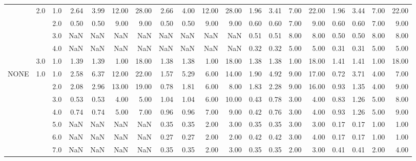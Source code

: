 \begin{tabular}{lllrrrrrrrrrrrrrrrr}
     & 2.0 & 1.0  &       2.64 &      3.99 & 12.00 &  28.00 &       2.66 &      4.00 & 12.00 &  28.00 &       1.96 &      3.41 &  7.00 &  22.00 &       1.96 &      3.44 & 7.00 &  22.00 \\
     &     & 2.0  &       0.50 &      0.50 &  9.00 &   9.00 &       0.50 &      0.50 &  9.00 &   9.00 &       0.60 &      0.60 &  7.00 &   9.00 &       0.60 &      0.60 & 7.00 &   9.00 \\
     &     & 3.0  &        NaN &       NaN &   NaN &    NaN &        NaN &       NaN &   NaN &    NaN &       0.51 &      0.51 &  8.00 &   8.00 &       0.50 &      0.50 & 8.00 &   8.00 \\
     &     & 4.0  &        NaN &       NaN &   NaN &    NaN &        NaN &       NaN &   NaN &    NaN &       0.32 &      0.32 &  5.00 &   5.00 &       0.31 &      0.31 & 5.00 &   5.00 \\
     & 3.0 & 1.0  &       1.39 &      1.39 &  1.00 &  18.00 &       1.38 &      1.38 &  1.00 &  18.00 &       1.38 &      1.38 &  1.00 &  18.00 &       1.41 &      1.41 & 1.00 &  18.00 \\
NONE & 1.0 & 1.0  &       2.58 &      6.37 & 12.00 &  22.00 &       1.57 &      5.29 &  6.00 &  14.00 &       1.90 &      4.92 &  9.00 &  17.00 &       0.72 &      3.71 & 4.00 &   7.00 \\
     &     & 2.0  &       2.08 &      2.96 & 13.00 &  19.00 &       0.78 &      1.81 &  6.00 &   8.00 &       1.83 &      2.28 &  9.00 &  16.00 &       0.93 &      1.35 & 4.00 &   9.00 \\
     &     & 3.0  &       0.53 &      0.53 &  4.00 &   5.00 &       1.04 &      1.04 &  6.00 &  10.00 &       0.43 &      0.78 &  3.00 &   4.00 &       0.83 &      1.26 & 5.00 &   8.00 \\
     &     & 4.0  &       0.74 &      0.74 &  5.00 &   7.00 &       0.96 &      0.96 &  7.00 &   9.00 &       0.42 &      0.76 &  3.00 &   4.00 &       0.93 &      1.26 & 5.00 &   9.00 \\
     &     & 5.0  &        NaN &       NaN &   NaN &    NaN &       0.35 &      0.35 &  2.00 &   3.00 &       0.35 &      0.35 &  3.00 &   3.00 &       0.17 &      0.17 & 1.00 &   1.00 \\
     &     & 6.0  &        NaN &       NaN &   NaN &    NaN &       0.27 &      0.27 &  2.00 &   2.00 &       0.42 &      0.42 &  3.00 &   4.00 &       0.17 &      0.17 & 1.00 &   1.00 \\
     &     & 7.0  &        NaN &       NaN &   NaN &    NaN &       0.35 &      0.35 &  2.00 &   3.00 &       0.35 &      0.35 &  2.00 &   3.00 &       0.41 &      0.41 & 2.00 &   4.00 \\

\end{tabular}
